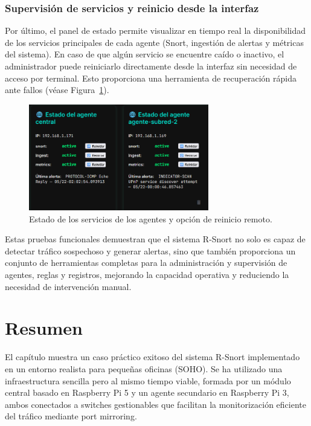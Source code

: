 \documentclass[11pt,a4paper,twoside]{report}
\begin{document}
\subsubsection{Supervisión de servicios y reinicio desde la interfaz}

Por último, el panel de estado permite visualizar en tiempo real la disponibilidad de los servicios principales de cada agente (Snort, ingestión de alertas y métricas del sistema). En caso de que algún servicio se encuentre caído o inactivo, el administrador puede reiniciarlo directamente desde la interfaz sin necesidad de acceso por terminal. Esto proporciona una herramienta de recuperación rápida ante fallos (véase Figura~\ref{fig:estado_servicios_agentes}).

\begin{figure}[H]
	\centering
	\includegraphics[width=0.7\textwidth]{pruebas/9.png}
	\caption{Estado de los servicios de los agentes y opción de reinicio remoto.}
	\label{fig:estado_servicios_agentes}
\end{figure}

Estas pruebas funcionales demuestran que el sistema R-Snort no solo es capaz de detectar tráfico sospechoso y generar alertas, sino que también proporciona un conjunto de herramientas completas para la administración y supervisión de agentes, reglas y registros, mejorando la capacidad operativa y reduciendo la necesidad de intervención manual.

\section{Resumen}

El capítulo muestra un caso práctico exitoso del sistema R-Snort implementado en un entorno realista para pequeñas oficinas (SOHO). Se ha utilizado una infraestructura sencilla pero al mismo tiempo viable, formada por un módulo central basado en Raspberry Pi 5 y un agente secundario en Raspberry Pi 3, ambos conectados a switches gestionables que facilitan la monitorización eficiente del tráfico mediante port mirroring.\newline
\end{document}
